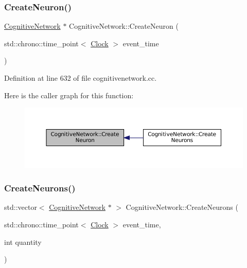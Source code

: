 \subsubsection{\texorpdfstring{Create\+Neuron()}{CreateNeuron()}}
{\footnotesize\ttfamily \mbox{\hyperlink{class_cognitive_network}{Cognitive\+Network}} $\ast$ Cognitive\+Network\+::\+Create\+Neuron (\begin{DoxyParamCaption}\item[{std\+::chrono\+::time\+\_\+point$<$ \mbox{\hyperlink{universe_8h_a0ef8d951d1ca5ab3cfaf7ab4c7a6fd80}{Clock}} $>$}]{event\+\_\+time }\end{DoxyParamCaption})}



Definition at line 632 of file cognitivenetwork.\+cc.

Here is the caller graph for this function\+:\nopagebreak
\begin{figure}[H]
\begin{center}
\leavevmode
\includegraphics[width=350pt]{class_cognitive_network_a9b5fcaf824d5b587775e7c44630affe6_icgraph}
\end{center}
\end{figure}
\mbox{\label{class_cognitive_network_af9b2a136584c962e44114a7ee3d2804a}} 
\subsubsection{\texorpdfstring{Create\+Neurons()}{CreateNeurons()}}
{\footnotesize\ttfamily std\+::vector$<$ \mbox{\hyperlink{class_cognitive_network}{Cognitive\+Network}} $\ast$ $>$ Cognitive\+Network\+::\+Create\+Neurons (\begin{DoxyParamCaption}\item[{std\+::chrono\+::time\+\_\+point$<$ \mbox{\hyperlink{universe_8h_a0ef8d951d1ca5ab3cfaf7ab4c7a6fd80}{Clock}} $>$}]{event\+\_\+time,  }\item[{int}]{quantity }\end{DoxyParamCaption})}



